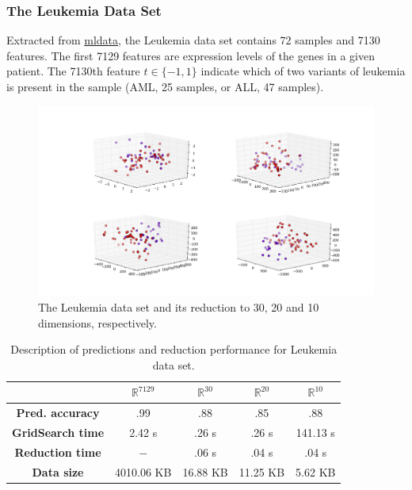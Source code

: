 \documentclass[12pt]{article}
\begin{document}
\subsubsection{The Leukemia Data Set}

Extracted from \href{http://mldata.com}{mldata}, the Leukemia data set contains 72 samples and 7130 features. The first 7129 features are expression levels of the genes in a given patient. The 7130th feature $t \in \{-1, 1\}$ indicate which of two variants of leukemia is present in the sample (AML, 25 samples, or ALL, 47 samples). \cite{on:duc_ds}

\begin{figure}[H]
	\centering
	\includegraphics[width=\linewidth]{img/experiments/leukemia}
	\captionsetup{justification=centering}
	\caption{The Leukemia data set and its reduction to 30, 20 and 10 dimensions, respectively.}
	\label{fig:leukemiads}
\end{figure}

\begin{table}[H]
	\centering
	\begin{tabular}{|c|c|c|c|c|}
		\hline
		& \textbf{$\mathbb{R}^{7129}$} & \textbf{$\mathbb{R}^{30}$} & \textbf{$\mathbb{R}^{20}$} & \textbf{$\mathbb{R}^{10}$} \\\hline
		\textbf{Pred. accuracy}    & .99 & .88 & .85 & .88 \\\hline
		\textbf{GridSearch time}   & 2.42 s & .26 s & .26 s & 141.13 s \\\hline
		\textbf{Reduction time}    & $-$ & .06 s & .04 s & .04 s \\\hline
		\textbf{Data size}         & 4010.06 KB & 16.88 KB & 11.25 KB & 5.62 KB \\\hline
	\end{tabular}
	\captionsetup{justification=centering}	
	\caption{Description of predictions and reduction performance for Leukemia data set.}
\end{table}
\end{document}
